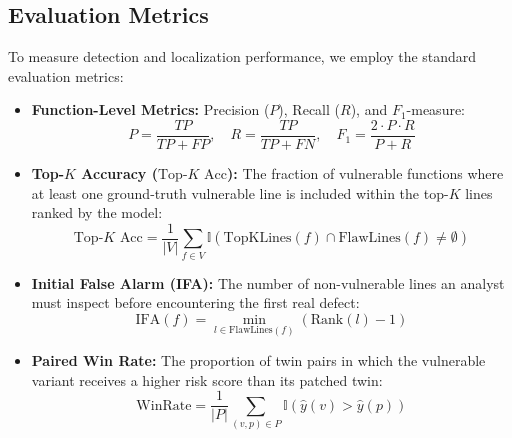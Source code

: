 \subsection{Evaluation Metrics}
To measure detection and localization performance, we employ the standard evaluation metrics:
\begin{itemize}
    \item \textbf{Function-Level Metrics:} Precision ($P$), Recall ($R$), and $F_1$-measure:
    \begin{equation}
        P = \frac{TP}{TP + FP}, \quad R = \frac{TP}{TP + FN}, \quad F_1 = \frac{2 \cdot P \cdot R}{P + R}
    \end{equation}
    \item \textbf{Top-$K$ Accuracy ($\text{Top-}K\text{ Acc}$):} The fraction of vulnerable functions where at least one ground-truth vulnerable line is included within the top-$K$ lines ranked by the model:
    \begin{equation}
        \text{Top-}K\text{ Acc} = \frac{1}{|V|} \sum_{f \in V} \mathbb{I}\left( \text{TopKLines}(f) \cap \text{FlawLines}(f) \neq \emptyset \right)
    \end{equation}
    \item \textbf{Initial False Alarm (IFA):} The number of non-vulnerable lines an analyst must inspect before encountering the first real defect:
    \begin{equation}
        \text{IFA}(f) = \min_{l \in \text{FlawLines}(f)} (\text{Rank}(l) - 1)
    \end{equation}
    \item \textbf{Paired Win Rate:} The proportion of twin pairs in which the vulnerable variant receives a higher risk score than its patched twin:
    \begin{equation}
        \text{WinRate} = \frac{1}{|P|} \sum_{(v, p) \in P} \mathbb{I}\left( \hat{y}(v) > \hat{y}(p) \right)
    \end{equation}
\end{itemize}

